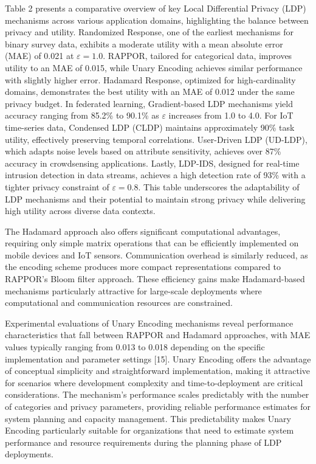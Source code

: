 \documentclass[conference]{IEEEtran}
\begin{document}
Table 2 presents a comparative overview of key Local Differential Privacy (LDP) mechanisms across various application domains, highlighting the balance between privacy and utility. Randomized Response, one of the earliest mechanisms for binary survey data, exhibits a moderate utility with a mean absolute error (MAE) of 0.021 at $\varepsilon = 1.0$. RAPPOR, tailored for categorical data, improves utility to an MAE of 0.015, while Unary Encoding achieves similar performance with slightly higher error. Hadamard Response, optimized for high-cardinality domains, demonstrates the best utility with an MAE of 0.012 under the same privacy budget. In federated learning, Gradient-based LDP mechanisms yield accuracy ranging from 85.2\% to 90.1\% as $\varepsilon$ increases from 1.0 to 4.0. For IoT time-series data, Condensed LDP (CLDP) maintains approximately 90\% task utility, effectively preserving temporal correlations. User-Driven LDP (UD-LDP), which adapts noise levels based on attribute sensitivity, achieves over 87\% accuracy in crowdsensing applications. Lastly, LDP-IDS, designed for real-time intrusion detection in data streams, achieves a high detection rate of 93\% with a tighter privacy constraint of $\varepsilon = 0.8$. This table underscores the adaptability of LDP mechanisms and their potential to maintain strong privacy while delivering high utility across diverse data contexts.

The Hadamard approach also offers significant computational advantages, requiring only simple matrix operations that can be efficiently implemented on mobile devices and IoT sensors. Communication overhead is similarly reduced, as the encoding scheme produces more compact representations compared to RAPPOR's Bloom filter approach. These efficiency gains make Hadamard-based mechanisms particularly attractive for large-scale deployments where computational and communication resources are constrained.

Experimental evaluations of Unary Encoding mechanisms reveal performance characteristics that fall between RAPPOR and Hadamard approaches, with MAE values typically ranging from 0.013 to 0.018 depending on the specific implementation and parameter settings [15]. Unary Encoding offers the advantage of conceptual simplicity and straightforward implementation, making it attractive for scenarios where development complexity and time-to-deployment are critical considerations. The mechanism's performance scales predictably with the number of categories and privacy parameters, providing reliable performance estimates for system planning and capacity management. This predictability makes Unary Encoding particularly suitable for organizations that need to estimate system performance and resource requirements during the planning phase of LDP deployments.
\end{document}
